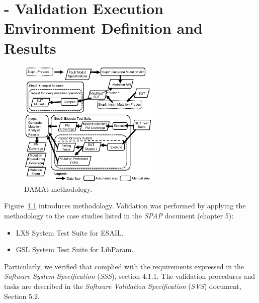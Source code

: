 
\chapter{\DAMA - Validation Execution Environment Definition and Results}

\begin{figure}[h]
  \centering
  \includegraphics[width=0.6\textwidth]{images/dataDrivenBufferProcess.pdf}
      \caption{DAMAt methodology.}
      \label{fig:damat}
\end{figure}

Figure~\ref{fig:damat} introduces \DAMA methodology.
Validation was performed by applying the \DAMA methodology to the case studies listed in the \emph{SPAP} document (chapter 5):
\begin{itemize}
  \item LXS System Test Suite for ESAIL.
  \item GSL System Test Suite for LibParam.
\end{itemize}

Particularly, we verified that \DAMA complied with the requirements expressed in the \emph{Software System Specification} (\emph{SSS}), section 4.1.1.
The validation procedures and tasks are described in the \emph{Software Validation Specification} (\emph{SVS}) document, Section 5.2.


